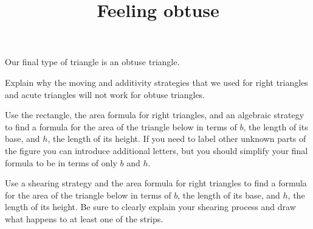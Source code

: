 \documentclass[nooutcomes,noauthor, handout]{ximera}
\title{Feeling obtuse}
\begin{document}
\begin{abstract}
\end{abstract}

\maketitle

Our final type of triangle is an obtuse triangle.

\begin{problem}
Explain why the moving and additivity strategies that we used for right triangles and acute triangles will not work for obtuse triangles. 

\begin{image}
\end{image}
\end{problem} \vfill

\begin{problem}
Use the rectangle, the area formula for right triangles, and an algebraic strategy to find a formula for the area of the triangle below in terms of $b$, the length of its base, and $h$, the length of its height. If you need to label other unknown parts of the figure you can introduce additional letters, but you should simplify your final formula to be in terms of only $b$ and $h$.

\begin{image}
\end{image}
\end{problem} \vfill

\newpage
\begin{problem}
Use a shearing strategy and the area formula for right triangles to find a formula for the area of the triangle below in terms of $b$, the length of its base, and $h$, the length of its height. Be sure to clearly explain your shearing process and draw what happens to at least one of the strips.

\begin{image}
\end{image}
\end{problem}
\end{document}
